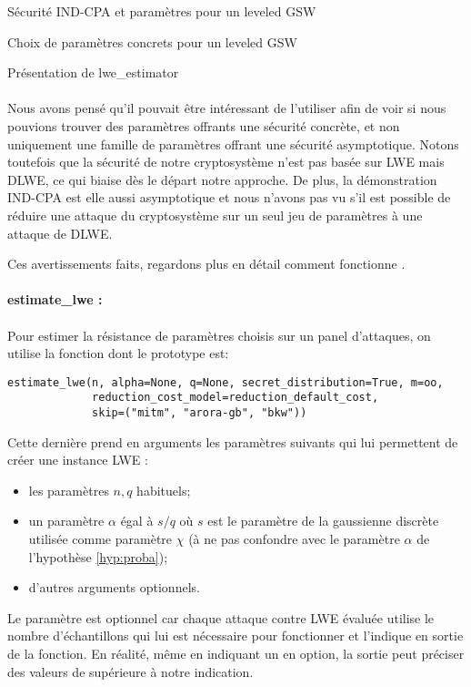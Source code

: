 \begin{section}{Sécurité IND-CPA et paramètres pour un leveled GSW}
\begin{subsection}{Choix de paramètres concrets pour un leveled GSW}
\begin{subsubsection}{Présentation de lwe\_estimator}
\paragraph{}
Nous avons pensé qu'il pouvait être intéressant de l'utiliser afin de voir si nous pouvions trouver des paramètres
offrants une sécurité concrète, et non uniquement une famille de paramètres offrant une sécurité asymptotique.
Notons toutefois que la sécurité de notre cryptosystème n'est pas basée sur LWE mais DLWE, ce qui biaise dès le départ 
notre approche. De plus, la démonstration IND-CPA est elle aussi asymptotique et nous n'avons pas vu s'il est possible 
de réduire une attaque du cryptosystème sur un seul jeu de paramètres à une attaque de DLWE.

Ces avertissements faits, regardons plus en détail comment fonctionne  .


\paragraph{}
\textbf{estimate\_lwe :}

\paragraph{}
Pour estimer la résistance de paramètres choisis sur un panel d'attaques, on utilise la fonction 
dont le prototype est:

\flushleft
	
	\begin{lstlisting}
estimate_lwe(n, alpha=None, q=None, secret_distribution=True, m=oo,
             reduction_cost_model=reduction_default_cost,
             skip=("mitm", "arora-gb", "bkw"))
        \end{lstlisting}
	
\flushleft
Cette dernière prend en arguments les paramètres suivants qui lui permettent de créer une instance LWE :
\begin{itemize}
\item les paramètres $n, q$ habituels;
\item un paramètre $\alpha$ égal à $s / q$ où $s$ est le paramètre de la gaussienne discrète utilisée comme paramètre
$\chi$ (à ne pas confondre avec le paramètre $\alpha$ de l'hypothèse \ref{hyp:proba});
\item d'autres arguments optionnels.
\end{itemize}
Le paramètre  est optionnel car chaque attaque contre LWE évaluée utilise le nombre d'échantillons  qui lui est nécessaire 
pour fonctionner et l'indique en sortie de la fonction. En réalité, même en indiquant un  en option, la
sortie peut préciser des valeurs de  supérieure à notre indication.


\end{subsubsection}
\end{subsection}
\end{section}
